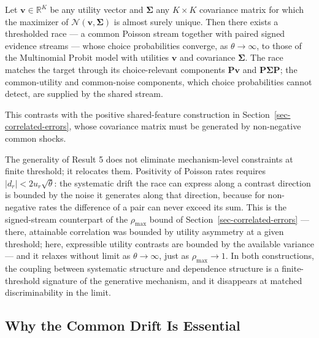 \documentclass[
  man,
  floatsintext,
  longtable,
  a4paper,
  nolmodern,
  notxfonts,
  notimes,
  colorlinks=true,linkcolor=blue,citecolor=blue,urlcolor=blue]{apa7}
\begin{document}
\begin{tcolorbox}[enhanced jigsaw, arc=.35mm, bottomrule=.15mm, bottomtitle=1mm, breakable, colback=white, colbacktitle=quarto-callout-note-color!10!white, colframe=quarto-callout-note-color-frame, coltitle=black, left=2mm, leftrule=.75mm, opacityback=0, opacitybacktitle=0.6, rightrule=.15mm, title={Result 5 (Signed Streams Span the Choice-Relevant Probit Class)}, titlerule=0mm, toprule=.15mm, toptitle=1mm]

Let \(\mathbf v\in\mathbb R^K\) be any utility vector and
\(\boldsymbol\Sigma\) any \(K\times K\) covariance matrix for which the
maximizer of \(\mathcal N(\mathbf v,\boldsymbol\Sigma)\) is almost
surely unique. Then there exists a thresholded race --- a common Poisson
stream together with paired signed evidence streams --- whose choice
probabilities converge, as \(\theta\to\infty\), to those of the
Multinomial Probit model with utilities \(\mathbf v\) and covariance
\(\boldsymbol\Sigma\). The race matches the target through its
choice-relevant components \(\mathbf P\mathbf v\) and
\(\mathbf P\boldsymbol\Sigma\mathbf P\); the common-utility and
common-noise components, which choice probabilities cannot detect, are
supplied by the shared stream.

\end{tcolorbox}

This contrasts with the positive shared-feature construction in
Section~\ref{sec-correlated-errors}, whose covariance matrix must be
generated by non-negative common shocks.

The generality of Result 5 does not eliminate mechanism-level
constraints at finite threshold; it relocates them. Positivity of
Poisson rates requires \(|d_r|<2u_r\sqrt{\theta}\): the systematic drift
the race can express along a contrast direction is bounded by the noise
it generates along that direction, because for non-negative rates the
difference of a pair can never exceed its sum. This is the signed-stream
counterpart of the \(\rho_{\max}\) bound of
Section~\ref{sec-correlated-errors} --- there, attainable correlation
was bounded by utility asymmetry at a given threshold; here, expressible
utility contrasts are bounded by the available variance --- and it
relaxes without limit as \(\theta\to\infty\), just as
\(\rho_{\max}\to 1\). In both constructions, the coupling between
systematic structure and dependence structure is a finite-threshold
signature of the generative mechanism, and it disappears at matched
discriminability in the limit.

\subsection{Why the Common Drift Is
Essential}\label{why-the-common-drift-is-essential}
\end{document}

